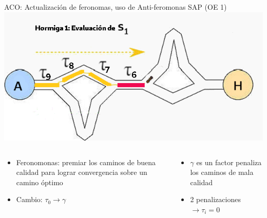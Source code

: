 \begin{frame}{ACO: Actualizaci\'on de feronomas, uso de Anti-feromonas SAP (OE 1)}
    \centering
    \includegraphics[scale=0.4]{Pictures/ACO-ant-ferom-penalize.png}
    \begin{columns}
        \begin{column}{0.5\textwidth}
            \begin{itemize}
            \small
                \item Feronomonas: premiar los caminos de buena calidad para lograr convergencia sobre un camino \'optimo
                \item Cambio: $\tau_0 \longrightarrow \gamma$
                
            \end{itemize}
        \end{column}
        \begin{column}{0.5\textwidth}
            \begin{itemize}
            \small
                
                \item $\gamma$ es un factor penaliza los caminos de mala calidad
                \item 2 penalizaciones $\longrightarrow \tau_i = 0$ 
            \end{itemize}
        \end{column}
    \end{columns}
    
\end{frame}


